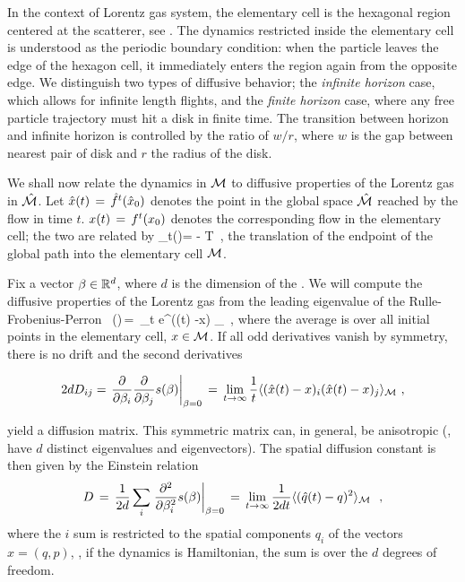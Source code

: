 \documentclass[aps,pre,
                showpacs,
                twocolumn,
                groupedaddress,
                floatfix]{revtex4-1}
\begin{document}
In the context of Lorentz gas system, the elementary cell is the
hexagonal region centered at the scatterer, see
. The dynamics restricted inside the elementary
cell is understood as the periodic boundary condition: when the particle
leaves the edge of the hexagon cell, it immediately enters the region
again from the opposite edge. We distinguish two types of diffusive
behavior; the {\em infinite horizon} case, which allows for infinite
length flights, and the {\em finite horizon} case, where any free
particle trajectory must hit a disk in finite time. The transition
between horizon and infinite horizon is controlled by the ratio of
$w/r$, where $w$ is the gap between nearest pair of disk and $r$ the
radius of the disk.

We shall now relate the dynamics in ${\cal M}$ to diffusive properties of
the Lorentz gas in $\hat {{\cal M}}$. Let $\hat x(t)\,=\,{\hat{f}^{t}(\hat x_0)}$ denotes the
point in the global space $\hat {{\cal M}}$ reached by the flow in time
$t$. $x(t)\,=\,{f^{t}({x_0})}$ denotes the corresponding flow in the
elementary cell; the two are related by
 \beq \hn_t(\xInit)=
 -  \in T \,, 
the translation of the endpoint of the global path into the elementary
cell $\pS$.

Fix a vector $\beta \in \reals^d$, where $d$ is the dimension of the
{\statesp}. We will compute the diffusive properties of the Lorentz
gas from the leading eigenvalue of the Rulle-Frobenius-Perron \evOper\
\beq \eigenvL(\beta)\,=\, \lim_{t \rightarrow \infty}  \log
\langle e^{\beta \cdot (\hx(t) -x) } \rangle_\pS ~, \quad
{}
where the average is over all initial points in the elementary cell,
$x \in \pS$. If all odd derivatives vanish by symmetry, there is no drift and the second derivatives
\begin{widetext}
\[
2d D_{ij} = \left . {\frac{\partial}{\partial \beta_i}}
  {\frac{\partial} {\partial \beta_j}} \eigenvL(\beta)\right
|_{\beta=0} \,=\,\lim_{t\rightarrow \infty} {\frac{1}{t}} \langle
{(\hx(t) -x)_i (\hx(t) -x)_j } \rangle_\pS ~,
\]
\end{widetext}
yield a diffusion matrix.  This symmetric matrix can, in general, be
anisotropic (\ie, have $d$ distinct eigenvalues and
eigen\-vectors). The spatial diffusion constant is then given by the
Einstein relation
\[
D\,=\,{1\over 2 d} \sum_i \left .{{\partial}^2 \over {\partial
      \beta^2_i}} s(\beta)\right |_{\beta=0} \,=\,
\lim_{t\rightarrow \infty} {1\over{2d t}} \langle {(\hat{q}(t) -q)^2 }
\rangle_{{\cal M}}~ ~,
\]
where the $i$ sum is restricted to the spatial components $q_i$ of the
{\statesp} vectors $x=(q,p)$, \ie, if the dynamics is Hamiltonian, the
sum is over the $d$ degrees of freedom.
\end{document}
